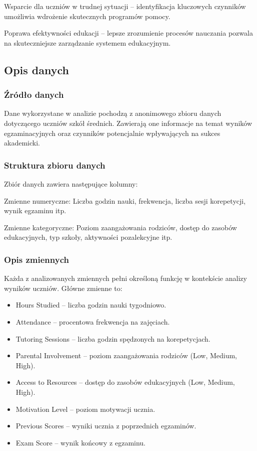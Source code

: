 \documentclass[
]{article}
\begin{document}
Wsparcie dla uczniów w trudnej sytuacji -- identyfikacja kluczowych
czynników umożliwia wdrożenie skutecznych programów pomocy.

Poprawa efektywności edukacji -- lepsze zrozumienie procesów nauczania
pozwala na skuteczniejsze zarządzanie systemem edukacyjnym.

\subsection{Opis danych}\label{opis-danych}

\subsubsection{Źródło danych}\label{ux17aruxf3dux142o-danych}

Dane wykorzystane w analizie pochodzą z anonimowego zbioru danych
dotyczącego uczniów szkół średnich. Zawierają one informacje na temat
wyników egzaminacyjnych oraz czynników potencjalnie wpływających na
sukces akademicki.

\subsubsection{Struktura zbioru danych}\label{struktura-zbioru-danych}

Zbiór danych zawiera następujące kolumny:

Zmienne numeryczne: Liczba godzin nauki, frekwencja, liczba sesji
korepetycji, wynik egzaminu itp.

Zmienne kategoryczne: Poziom zaangażowania rodziców, dostęp do zasobów
edukacyjnych, typ szkoły, aktywności pozalekcyjne itp.

\subsubsection{Opis zmiennych}\label{opis-zmiennych}

Każda z analizowanych zmiennych pełni określoną funkcję w kontekście
analizy wyników uczniów. Główne zmienne to:

\begin{itemize}
\item
  Hours Studied -- liczba godzin nauki tygodniowo.
\item
  Attendance -- procentowa frekwencja na zajęciach.
\item
  Tutoring Sessions -- liczba godzin spędzonych na korepetycjach.
\item
  Parental Involvement -- poziom zaangażowania rodziców (Low, Medium,
  High).
\item
  Access to Resources -- dostęp do zasobów edukacyjnych (Low, Medium,
  High).
\item
  Motivation Level -- poziom motywacji ucznia.
\item
  Previous Scores -- wyniki ucznia z poprzednich egzaminów.
\item
  Exam Score -- wynik końcowy z egzaminu.
\end{itemize}
\end{document}
